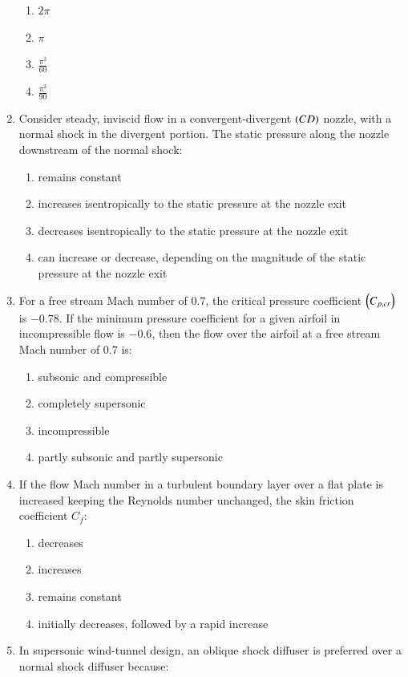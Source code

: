 \documentclass[journal]{IEEEtran}
\begin{document}
\begin{enumerate}[start=35]
\begin{enumerate}
    \item $2\pi$
    \item $\pi$
    \item $\frac{\pi^2}{60}$
    \item $\frac{\pi^2}{90}$
\end{enumerate}
\item Consider steady, inviscid flow in a convergent-divergent $\left(CD\right)$ nozzle, with a normal shock in the divergent portion. The static pressure along the nozzle downstream of the normal shock:
\begin{enumerate}
    \item remains constant
    \item increases isentropically to the static pressure at the nozzle exit
    \item decreases isentropically to the static pressure at the nozzle exit
    \item can increase or decrease, depending on the magnitude of the static pressure at the nozzle exit
\end{enumerate}
\item For a free stream Mach number of $0.7$, the critical pressure coefficient $\left(C_{p,cr}\right)$ is $-0.78$. If the minimum pressure coefficient for a given airfoil in incompressible flow is $-0.6$, then the flow over the airfoil at a free stream Mach number of $0.7$ is:
\begin{enumerate}
    \item subsonic and compressible
    \item completely supersonic
    \item incompressible
    \item partly subsonic and partly supersonic
\end{enumerate}
\item If the flow Mach number in a turbulent boundary layer over a flat plate is increased keeping the Reynolds number unchanged, the skin friction coefficient $C_f$:
\begin{enumerate}
    \item decreases
    \item increases
    \item remains constant
    \item initially decreases, followed by a rapid increase
\end{enumerate}
\item In supersonic wind-tunnel design, an oblique shock diffuser is preferred over a normal shock diffuser because:

\end{enumerate}
\end{document}
